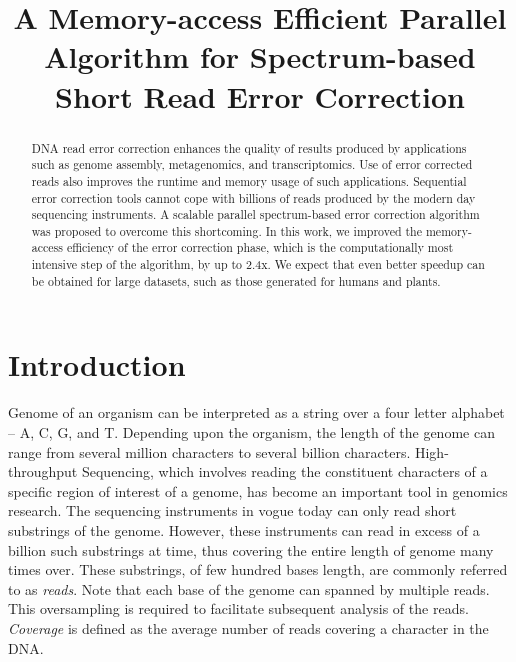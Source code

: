 \documentclass[10pt, conference]{IEEEtran}
\begin{document}
\title{A Memory-access Efficient Parallel Algorithm for Spectrum-based Short Read Error Correction}

\author{
}


\maketitle

\begin{abstract}
DNA read error correction enhances the quality of results produced by applications such as genome assembly, metagenomics, and transcriptomics. Use of error corrected reads also improves the runtime and memory usage of such applications. Sequential error correction tools cannot cope with billions of reads produced by the modern day sequencing instruments. A scalable parallel spectrum-based error correction algorithm was proposed to overcome this shortcoming. In this work, we improved the memory-access efficiency of the error correction phase, which is the computationally most intensive step of the algorithm, by up to 2.4x. We expect that even better speedup can be obtained for large datasets, such as those generated for humans and plants.
\end{abstract}


\section{Introduction} \label{sec_Introduction}
Genome of an organism can be interpreted as a string over a four letter alphabet -- A, C, G, and T. Depending upon the organism, the length of the genome can range from several million characters to several billion characters. High-throughput Sequencing, which involves reading the constituent characters of a specific region of interest of a genome, has become an important tool in genomics research. The sequencing instruments in vogue today can only read short substrings of the genome. However, these instruments can read in excess of a billion such substrings at time, thus covering the entire length of genome many times over. These substrings, of few hundred bases length, are commonly referred to as {\it reads}. Note that each base of the genome can spanned by multiple reads. This oversampling is required to facilitate subsequent analysis of the reads. {\it Coverage} is defined as the average number of reads covering a character in the DNA.
\end{document}
